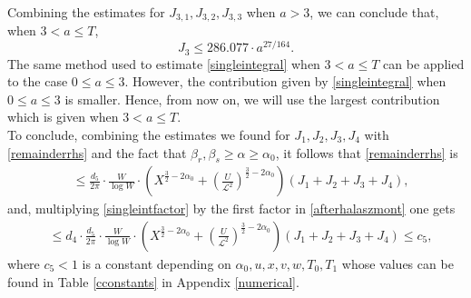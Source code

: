 \documentclass[reqno]{amsart}
\numberwithin{equation}{section}
\theoremstyle{remark}
\begin{document}
    Combining the estimates for $J_{3,1},J_{3,2},J_{3,3}$ when $a>3$, we can conclude that, when $3<a\le T$, 
    \begin{equation}\label{estJ3}
        J_{3}\le 286.077 \cdot a^{27/164}.
    \end{equation}
The same method used to estimate \eqref{singleintegral} when $3<a\le T$ can be applied to the case $0\le a\le 3$. However, the contribution given by \eqref{singleintegral} when $0\le a\le 3$ is smaller. Hence, from now on, we will use the largest contribution which is given when $3<a\le T$.\\
To conclude, combining the estimates we found for $J_1,J_2,J_3,J_4$ with \eqref{remainderrhs} and the fact that $\beta_r,\beta_s\ge\alpha\ge\alpha_0$, it follows that \eqref{remainderrhs} is
   \begin{equation}\label{singleintfactor}
\begin{aligned}
    & \le \frac{ d_5}{2\pi}\cdot \frac{W}{\log W}\cdot\left(X^{\frac{3}{2}-2\alpha_0}+\left(\frac{U}{\mathcal{L}^2}\right)^{\frac{3}{2}-2\alpha_0}\right)\left(J_1+J_2+J_3+J_4\right),
\end{aligned}
\end{equation}
and, multiplying \eqref{singleintfactor} by the first factor in \eqref{afterhalaszmont} one gets
\begin{equation}\label{integralcontriution}
\begin{aligned}
    & \le d_4\cdot \frac{ d_5}{2\pi}\cdot \frac{W}{\log W}\cdot\left(X^{\frac{3}{2}-2\alpha_0}+\left(\frac{U}{\mathcal{L}^2}\right)^{\frac{3}{2}-2\alpha_0}\right)\left(J_1+J_2+J_3+J_4\right)\le c_5,
\end{aligned}
\end{equation}
where $c_5<1$ is a constant depending on $\alpha_0,u,x,v,w,T_0,T_1$ whose values can be found in Table \ref{cconstants} in Appendix \ref{numerical}.\\
\end{document}
